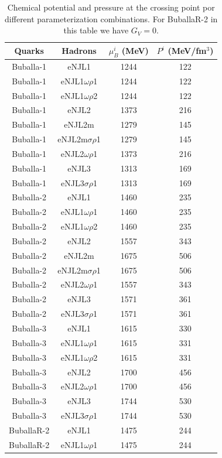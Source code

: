 \documentclass[prc, reprint, amsmath, floatfix,10pt]{revtex4-1}
\begin{document}
\begin{table}[!htpb]
\centering
\caption{Chemical potential and pressure at the crossing point por different parameterization combinations. For BuballaR-2 in this table we have $G_V = 0$.\label{Tab:Transition_chemical_pot}}
\begin{ruledtabular}
\begin{tabular}{cccc}
Quarks & Hadrons & $\mu_B^i$ (MeV) & $P^i$ (MeV/fm$^3$) \\
\hline
Buballa-1 & eNJL1 & 1244 & 122\\
Buballa-1 & eNJL1$\omega\rho$1 & 1244 & 122 \\
Buballa-1 & eNJL1$\omega\rho$2 & 1244 & 122 \\
Buballa-1 & eNJL2 & 1373 & 216\\
Buballa-1 & eNJL2m & 1279 & 145\\
Buballa-1 & eNJL2m$\sigma\rho$1 & 1279 & 145 \\
Buballa-1 & eNJL2$\omega\rho$1 & 1373 & 216 \\
Buballa-1 & eNJL3 & 1313 & 169\\
Buballa-1 & eNJL3$\sigma\rho$1 & 1313 & 169 \\
Buballa-2 & eNJL1 & 1460 & 235\\
Buballa-2 & eNJL1$\omega\rho$1 & 1460 & 235 \\
Buballa-2 & eNJL1$\omega\rho$2 & 1460 & 235 \\
Buballa-2 & eNJL2 & 1557 & 343\\
Buballa-2 & eNJL2m & 1675 & 506\\
Buballa-2 & eNJL2m$\sigma\rho$1 & 1675 & 506 \\
Buballa-2 & eNJL2$\omega\rho$1 & 1557 & 343 \\
Buballa-2 & eNJL3 & 1571 & 361 \\
Buballa-2 & eNJL3$\sigma\rho$1 & 1571 & 361 \\
Buballa-3 & eNJL1 & 1615 & 330\\
Buballa-3 & eNJL1$\omega\rho$1 & 1615 & 331 \\
Buballa-3 & eNJL1$\omega\rho$2 & 1615 & 331 \\
Buballa-3 & eNJL2 & 1700 & 456 \\
Buballa-3 & eNJL2$\omega\rho$1 & 1700 & 456 \\
Buballa-3 & eNJL3 & 1744 & 530\\
Buballa-3 & eNJL3$\sigma\rho$1 & 1744 & 530 \\
BuballaR-2 & eNJL1 & 1475 & 244 \\
BuballaR-2 & eNJL1$\omega\rho$1 & 1475 & 244 \\

\end{tabular}
\end{ruledtabular}
\end{table}
\end{document}
